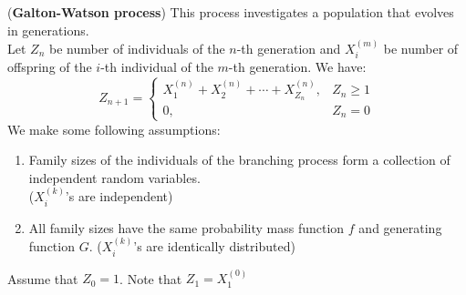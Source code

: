 \documentclass{huhtakm-template-book}
\begin{document}
\begin{eg}(\textbf{Galton-Watson process}) 
	This process investigates a population that evolves in generations.\\
	Let $Z_{n}$ be number of individuals of the $n$-th generation and $X_{i}^{(m)}$ be number of offspring of the $i$-th individual of the $m$-th generation. We have:
	\begin{equation*}
		Z_{n+1}=\begin{cases}
			X_{1}^{(n)}+X_{2}^{(n)}+\cdots+X_{Z_{n}}^{(n)}, &Z_{n}\geq 1\\
			0, &Z_{n}=0
		\end{cases}
	\end{equation*}
	We make some following assumptions:
	\begin{enumerate}
		\item Family sizes of the individuals of the branching process form a collection of independent random variables.\\
		($X_{i}^{(k)}$'s are independent)
		\item All family sizes have the same probability mass function $f$ and generating function $G$. ($X_{i}^{(k)}$'s are identically distributed)
	\end{enumerate}
	Assume that $Z_{0}=1$. Note that $Z_{1}=X_{1}^{(0)}$
\end{eg}
\end{document}
